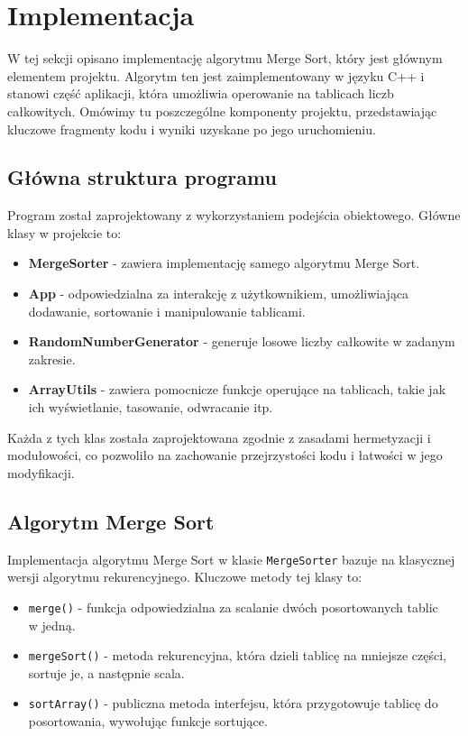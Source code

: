 \newpage
\section{Implementacja}
W tej sekcji opisano implementację algorytmu Merge Sort, który jest głównym elementem projektu. Algorytm ten jest zaimplementowany w języku C++ i stanowi część aplikacji, która umożliwia operowanie na tablicach liczb całkowitych. Omówimy tu poszczególne komponenty projektu, przedstawiając kluczowe fragmenty kodu i wyniki uzyskane po jego uruchomieniu.

\subsection{Główna struktura programu}

Program został zaprojektowany z wykorzystaniem podejścia obiektowego. Główne klasy w projekcie to:

\begin{itemize}
  \item \textbf{MergeSorter} - zawiera implementację samego algorytmu Merge Sort.
  \item \textbf{App} - odpowiedzialna za interakcję z użytkownikiem, umożliwiająca dodawanie, sortowanie i manipulowanie tablicami.
  \item \textbf{RandomNumberGenerator} - generuje losowe liczby całkowite w zadanym zakresie.
  \item \textbf{ArrayUtils} - zawiera pomocnicze funkcje operujące na tablicach, takie jak ich wyświetlanie, tasowanie, odwracanie itp.
\end{itemize}

Każda z tych klas została zaprojektowana zgodnie z zasadami hermetyzacji i modułowości, co pozwoliło na zachowanie przejrzystości kodu i łatwości w jego modyfikacji.

\subsection{Algorytm Merge Sort}

Implementacja algorytmu Merge Sort w klasie \texttt{MergeSorter} bazuje na klasycznej wersji algorytmu rekurencyjnego. Kluczowe metody tej klasy to:

\begin{itemize}
  \item \texttt{merge()} - funkcja odpowiedzialna za scalanie dwóch posortowanych tablic \\ w jedną.
  \item \texttt{mergeSort()} - metoda rekurencyjna, która dzieli tablicę na mniejsze części, sortuje je, a następnie scala.
  \item \texttt{sortArray()} - publiczna metoda interfejsu, która przygotowuje tablicę do posortowania, wywołując funkcje sortujące.
\end{itemize}

